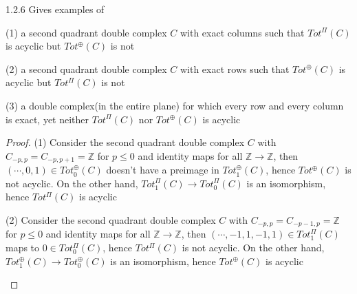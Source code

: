\documentclass[../main.tex]{subfiles}
\begin{document}
\begin{customexercise}{1.2.6}
Gives examples of \par
(1) a second quadrant double complex $C$ with exact columns such that $Tot^{\Pi}(C)$ is acyclic but $Tot^{\oplus}(C)$ is not \par
(2) a second quadrant double complex $C$ with exact rows such that $Tot^\oplus(C)$ is acyclic but $Tot^{\Pi}(C)$ is not \par
(3) a double complex(in the entire plane) for which every row and every column is exact, yet neither $Tot^{\Pi}(C)$ nor $Tot^{\oplus}(C)$ is acyclic
\end{customexercise}

\begin{proof}
(1) Consider the second quadrant double complex $C$ with $C_{-p,p}=C_{-p,p+1}=\mathbb Z$ for $p\leq0$ and identity maps for all $\mathbb Z\to\mathbb Z$, then $(\cdots,0,1)\in Tot^\oplus_0(C)$ doesn't have a preimage in $Tot^\oplus_1(C)$, hence $Tot^\oplus(C)$ is not acyclic. On the other hand, $Tot^\Pi_1(C)\to Tot^\Pi_0(C)$ is an isomorphism, hence $Tot^\Pi(C)$ is acyclic
\begin{center}
\end{center}
(2) Consider the second quadrant double complex $C$ with $C_{-p,p}=C_{-p-1,p}=\mathbb Z$ for $p\leq0$ and identity maps for all $\mathbb Z\to\mathbb Z$, then $(\cdots,-1,1,-1,1)\in Tot^\Pi_1(C)$ maps to $0\in Tot^\Pi_0(C)$, hence $Tot^\Pi(C)$ is not acyclic. On the other hand, $Tot^\oplus_1(C)\to Tot^\oplus_0(C)$ is an isomorphism, hence $Tot^\oplus(C)$ is acyclic
\begin{center}
\end{center}
\end{proof}
\end{document}
